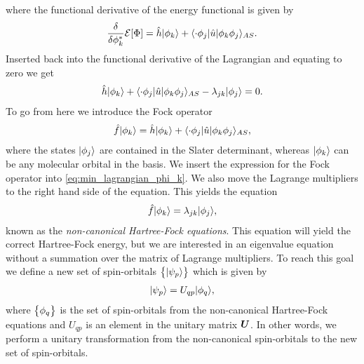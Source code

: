         where the functional derivative of the energy functional is given by
        \begin{align}
            \frac{\delta }{\delta \phi_k^{*}}\mathcal{E}[\Phi]
            = \hat{h}| \phi_k \rangle
            + \langle \cdot\phi_j |\hat{u}| \phi_k\phi_j \rangle_{AS}.
        \end{align}
        Inserted back into the functional derivative of the Lagrangian and
        equating to zero we get
        \begin{gather}
            \hat{h}| \phi_k \rangle
            + \langle \cdot\phi_j |\hat{u}| \phi_k\phi_j \rangle_{AS}
            - \lambda_{jk}| \phi_{j} \rangle = 0.
            \label{eq:min_lagrangian_phi_k}
        \end{gather}
        To go from here we introduce the Fock operator
        \begin{align}
            \hat{f}| \phi_k \rangle
            = \hat{h}| \phi_k \rangle
            + \langle \cdot\phi_j |\hat{u}| \phi_k\phi_j \rangle_{AS},
        \end{align}
        where the states $| \phi_j \rangle$ are contained in the Slater determinant,
        whereas $| \phi_k \rangle$ can be any molecular orbital in the basis.
        We insert the expression for the Fock operator into
        \autoref{eq:min_lagrangian_phi_k}.
        We also move the Lagrange multipliers to the right hand side of the
        equation.
        This yields the equation
        \begin{align}
            \hat{f}| \phi_k \rangle = \lambda_{jk}| \phi_j \rangle,
            \label{eq:non-canonical-hartree-fock}
        \end{align}
        known as the \emph{non-canonical Hartree-Fock equations}.
        This equation will yield the correct Hartree-Fock energy, but we are
        interested in an eigenvalue equation without a summation over the matrix
        of Lagrange multipliers.
        To reach this goal we define a new set of spin-orbitals
        $\left\{ | \psi_p \rangle \right\}$ which is given by
        \begin{align}
            | \psi_p \rangle = U_{qp}| \phi_q \rangle,
        \end{align}
        where $\left\{ \phi_q \right\}$ is the set of spin-orbitals from the non-canonical
        Hartree-Fock equations and $U_{qp}$ is an element in the unitary matrix
        $\boldsymbol{U}$.
        In other words, we perform a unitary transformation from the
        non-canonical spin-orbitals to the new set of spin-orbitals.
